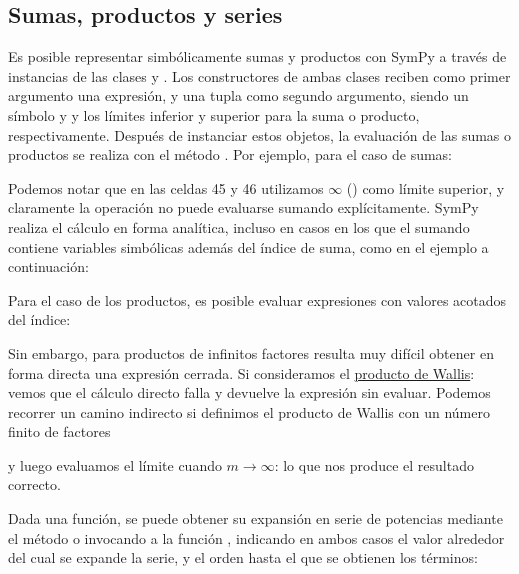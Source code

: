 \subsection{Sumas, productos y series}
Es posible representar simbólicamente sumas y productos con SymPy a través de instancias de las clases  y . Los constructores de ambas clases reciben como primer argumento una expresión, y una tupla  como segundo argumento, siendo  un símbolo y  y  los límites inferior y superior para la suma o producto, respectivamente. Después de instanciar estos objetos, la evaluación de las sumas o productos se realiza con el método . Por ejemplo, para el caso de sumas:

Podemos notar que en las celdas 45 y 46 utilizamos $\infty$ () como límite superior, y claramente la operación no puede evaluarse sumando explícitamente. SymPy realiza el cálculo en forma analítica, incluso en casos en los que el sumando contiene variables simbólicas además del índice de suma, como en el ejemplo a continuación:

Para el caso de los productos, es posible evaluar expresiones con valores acotados del índice:

Sin embargo, para productos de infinitos factores resulta muy difícil obtener en forma directa una expresión cerrada. Si consideramos el \href{https://es.wikipedia.org/wiki/Producto_de_Wallis}{producto de Wallis}:
\noindent vemos que el cálculo directo falla y devuelve la expresión sin evaluar. Podemos recorrer un camino indirecto si definimos el producto de Wallis con un número finito de factores 

\noindent y luego evaluamos el límite cuando $m \rightarrow \infty$:
\noindent lo que nos produce el resultado correcto.

Dada una función, se puede obtener su expansión en serie de potencias mediante el método  o invocando a la función , indicando en ambos casos el valor alrededor del cual se expande la serie, y el orden hasta el que se obtienen los términos:

